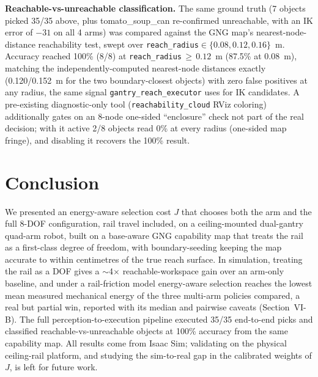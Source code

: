 \documentclass[conference]{IEEEtran}
\begin{document}
\textbf{Reachable-vs-unreachable classification.} The same ground truth (7
objects picked 35/35 above, plus tomato\_soup\_can re-confirmed unreachable, with an IK
error of $-31$ on all 4 arms) was compared against the GNG map's
nearest-node-distance reachability test, swept over
\texttt{reach\_radius}$\in\{0.08,0.12,0.16\}$~m. Accuracy reached 100\%
(8/8) at \texttt{reach\_radius}$\,\geq\,0.12$~m (87.5\% at 0.08~m), matching the
independently-computed nearest-node distances exactly (0.120/0.152~m for the two
boundary-closest objects) with zero false positives at any radius, the same
signal \texttt{gantry\_reach\_executor} uses for IK candidates. A pre-existing
diagnostic-only tool (\texttt{reachability\_cloud} RViz coloring) additionally
gates on an 8-node one-sided ``enclosure'' check not part of the real decision;
with it active 2/8 objects read 0\% at every radius (one-sided map fringe), and
disabling it recovers the 100\% result.

\section{Conclusion}

We presented an energy-aware selection cost $J$ that chooses both
the arm and the full 8-DOF configuration, rail travel included, on a
ceiling-mounted dual-gantry quad-arm robot, built on a base-aware GNG capability
map that treats the rail as a first-class degree of freedom, with boundary-seeding
keeping the map accurate to within centimetres of the true reach surface. In
simulation, treating the rail as a DOF gives a $\sim$4$\times$
reachable-workspace gain over an arm-only baseline, and under a rail-friction
model energy-aware selection reaches the lowest mean measured mechanical energy of
the three multi-arm policies compared, a real but
partial win, reported with its median and pairwise caveats (Section~VI-B). The
full perception-to-execution pipeline executed 35/35 end-to-end picks and
classified reachable-vs-unreachable objects at 100\% accuracy from the same
capability map. All results come from Isaac Sim; validating on the physical
ceiling-rail platform, and studying the sim-to-real gap in the calibrated weights
of $J$, is left for future work.

\end{document}
